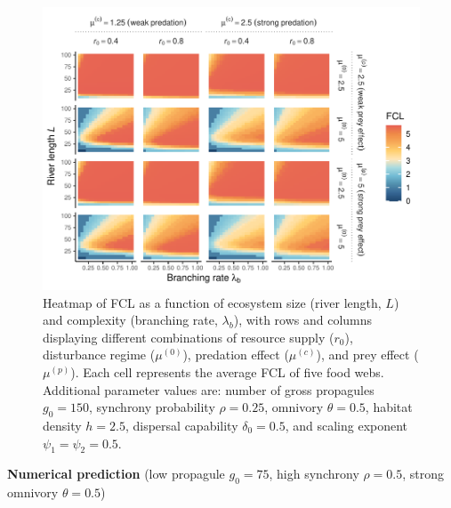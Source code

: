 \begin{figure}
\centering
\includegraphics{../data_fmt/fig_rho025_g150_theta05.pdf}
\caption{Heatmap of FCL as a function of ecosystem size (river length,
\(L\)) and complexity (branching rate, \(\lambda_b\)), with rows and
columns displaying different combinations of resource supply (\(r_0\)),
disturbance regime (\(\mu^{(0)}\)), predation effect (\(\mu^{(c)}\)),
and prey effect (\(\mu^{(p)}\)). Each cell represents the average FCL of
five food webs. Additional parameter values are: number of gross
propagules \(g_0=150\), synchrony probability \(\rho=0.25\), omnivory
\(\theta=0.5\), habitat density \(h=2.5\), dispersal capability
\(\delta_0=0.5\), and scaling exponent \(\psi_1=\psi_2=0.5\).}
\end{figure}

\newpage

\textbf{Numerical prediction} (low propagule \(g_0 = 75\), high
synchrony \(\rho = 0.5\), strong omnivory \(\theta = 0.5\))

